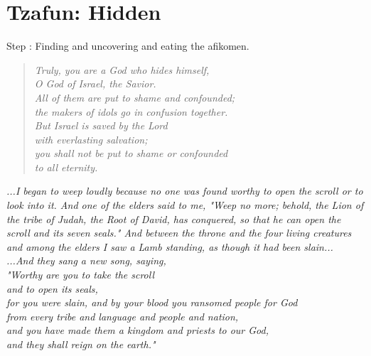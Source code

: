 \documentclass[10pt,oneside,footinclude=true,headinclude=true]{scrbook} %
\newcommand\quot[1]{
	\begin{quote}\textit{\small#1}\end{quote}
}
\newcommand\pagequot[1]{
	\newpage
	\clearscrheadfoot
	\vspace*{\stretch{2}}
	\begin{center}
	\begin{minipage}[c]{8cm}
		#1
	\end{minipage}
	\end{center}
	\vspace*{\stretch{3}}
}
\begin{document}
\chapter{Tzafun: Hidden}
\normalsize
Step \thechapter: Finding and uncovering and eating the afikomen.\\


\quot{Truly, you are a God who hides himself,\\
\hspace*{5mm}O God of Israel, the Savior.\\
All of them are put to shame and confounded;\\
\hspace*{5mm}the makers of idols go in confusion together.\\
But Israel is saved by the Lord\\
\hspace*{5mm}with everlasting salvation;\\
you shall not be put to shame or confounded\\
\hspace*{5mm}to all eternity.}

\pagequot{
\centering
\textit{...I began to weep loudly because no one was found worthy to open the scroll or to look into it. And one of the elders said to me, "Weep no more; behold, the Lion of the tribe of Judah, the Root of David, has conquered, so that he can open the scroll and its seven seals." And between the throne and the four living creatures and among the elders I saw a Lamb standing, as though it had been slain...\\
\vspace{2mm}
...And they sang a new song, saying,\\
"Worthy are you to take the scroll\\
\hspace*{5mm}and to open its seals,\\
for you were slain, and by your blood you ransomed people for God\\
\hspace*{5mm}from every tribe and language and people and nation,\\
and you have made them a kingdom and priests to our God,\\
\hspace*{5mm}and they shall reign on the earth."}\\
\bigskip
\spacedlowsmallcaps{Revelation 5:4-6, 9-10}
}
\end{document}
